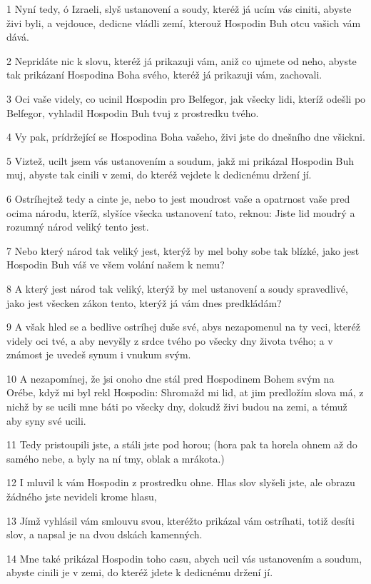 \par 1 Nyní tedy, ó Izraeli, slyš ustanovení a soudy, kteréž já ucím vás ciniti, abyste živi byli, a vejdouce, dedicne vládli zemí, kterouž Hospodin Buh otcu vašich vám dává.
\par 2 Nepridáte nic k slovu, kteréž já prikazuji vám, aniž co ujmete od neho, abyste tak prikázaní Hospodina Boha svého, kteréž já prikazuji vám, zachovali.
\par 3 Oci vaše videly, co ucinil Hospodin pro Belfegor, jak všecky lidi, kteríž odešli po Belfegor, vyhladil Hospodin Buh tvuj z prostredku tvého.
\par 4 Vy pak, prídržející se Hospodina Boha vašeho, živi jste do dnešního dne všickni.
\par 5 Viztež, ucilt jsem vás ustanovením a soudum, jakž mi prikázal Hospodin Buh muj, abyste tak cinili v zemi, do kteréž vejdete k dedicnému držení jí.
\par 6 Ostríhejtež tedy a cinte je, nebo to jest moudrost vaše a opatrnost vaše pred ocima národu, kteríž, slyšíce všecka ustanovení tato, reknou: Jiste lid moudrý a rozumný národ veliký tento jest.
\par 7 Nebo který národ tak veliký jest, kterýž by mel bohy sobe tak blízké, jako jest Hospodin Buh váš ve všem volání našem k nemu?
\par 8 A který jest národ tak veliký, kterýž by mel ustanovení a soudy spravedlivé, jako jest všecken zákon tento, kterýž já vám dnes predkládám?
\par 9 A však hled se a bedlive ostríhej duše své, abys nezapomenul na ty veci, kteréž videly oci tvé, a aby nevyšly z srdce tvého po všecky dny života tvého; a v známost je uvedeš synum i vnukum svým.
\par 10 A nezapomínej, že jsi onoho dne stál pred Hospodinem Bohem svým na Orébe, když mi byl rekl Hospodin: Shromažd mi lid, at jim predložím slova má, z nichž by se ucili mne báti po všecky dny, dokudž živi budou na zemi, a témuž aby syny své ucili.
\par 11 Tedy pristoupili jste, a stáli jste pod horou; (hora pak ta horela ohnem až do samého nebe, a byly na ní tmy, oblak a mrákota.)
\par 12 I mluvil k vám Hospodin z prostredku ohne. Hlas slov slyšeli jste, ale obrazu žádného jste nevideli krome hlasu,
\par 13 Jímž vyhlásil vám smlouvu svou, kteréžto prikázal vám ostríhati, totiž desíti slov, a napsal je na dvou dskách kamenných.
\par 14 Mne také prikázal Hospodin toho casu, abych ucil vás ustanovením a soudum, abyste cinili je v zemi, do kteréž jdete k dedicnému držení jí.
